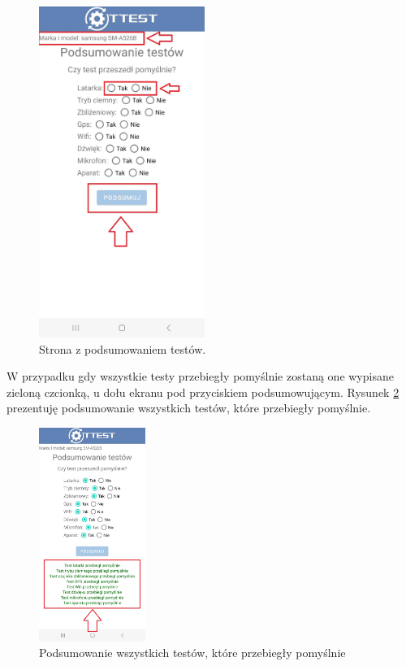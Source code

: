 \begin{figure}[!hbt]
	\begin{center}
		\includegraphics[angle=360, width=0.48\textwidth]{rys/punkt6/wyniki}
		\caption{Strona z podsumowaniem testów.}
		\label{rys:wyniki}
	\end{center}
\end{figure}

W przypadku gdy wszystkie testy przebiegły pomyślnie zostaną one wypisane zieloną czcionką, u dołu ekranu pod przyciskiem podsumowującym. Rysunek \ref{rys:wyniki1} prezentuję podsumowanie wszystkich testów, które przebiegły pomyślnie.

\newpage


\begin{figure}[!hbt]
	\begin{center}
		\includegraphics[angle=360, width=0.31\textwidth]{rys/punkt6/wyniki1}
		\caption{Podsumowanie wszystkich testów, które przebiegły pomyślnie}
		\label{rys:wyniki1}
	\end{center}
\end{figure}

